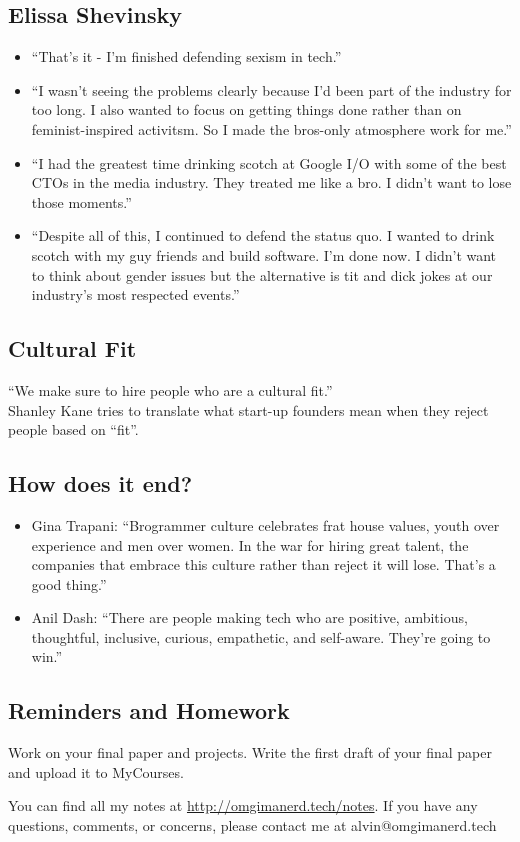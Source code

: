 \documentclass{article}
\begin{document}
\subsection*{Elissa Shevinsky}
\begin{itemize}
  \item ``That's it - I'm finished defending sexism in tech.''
  \item ``I wasn't seeing the problems clearly because I'd been part of the
    industry for too long. I also wanted to focus on getting things done
    rather than on feminist-inspired activitsm. So I made the bros-only
    atmosphere work for me.''
  \item ``I had the greatest time drinking scotch at Google I/O with some of
    the best CTOs in the media industry. They treated me like a bro. I didn't
    want to lose those moments.''
  \item ``Despite all of this, I continued to defend the status quo. I wanted
    to drink scotch with my guy friends and build software. I'm done now. I
    didn't want to think about gender issues but the alternative is tit and
    dick jokes at our industry's most respected events.''
\end{itemize}

\subsection*{Cultural Fit}
``We make sure to hire people who are a cultural fit.'' \\
Shanley Kane tries to translate what start-up founders mean when they reject
people based on ``fit''.

\subsection*{How does it end?}
\begin{itemize}
  \item Gina Trapani: ``Brogrammer culture celebrates frat house values,
    youth over experience and men over women. In the war for hiring great
    talent, the companies that embrace this culture rather than reject it will
    lose. That's a good thing.''
  \item Anil Dash: ``There are people making tech who are positive, ambitious,
    thoughtful, inclusive, curious, empathetic, and self-aware. They're going
    to win.''
\end{itemize}

\subsection*{Reminders and Homework}
Work on your final paper and projects. Write the first draft of your final
paper and upload it to MyCourses.

\begin{center}
  You can find all my notes at \url{http://omgimanerd.tech/notes}. If you have
  any questions, comments, or concerns, please contact me at
  alvin@omgimanerd.tech
\end{center}
\end{document}
